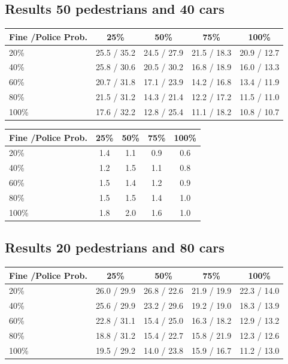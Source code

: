 \documentclass[a4paper]{article}
\begin{document}
\subsection{Results 50 pedestrians and 40 cars}
\begin{table}[H]
\centering
\begin{tabular}{ l | c c c c }
  Fine \slash Police Prob. & 25\% & 50\% & 75\% & 100\% \\ 
  \hline
  20\%  & 25.5 / 35.2 & 24.5 / 27.9 & 21.5 / 18.3 & 20.9 / 12.7  \\
  40\%  & 25.8 / 30.6 & 20.5 / 30.2 & 16.8 / 18.9 & 16.0 / 13.3  \\
  60\%  & 20.7 / 31.8 & 17.1 / 23.9 & 14.2 / 16.8 & 13.4 / 11.9  \\
  80\%  & 21.5 / 31.2 & 14.3 / 21.4 & 12.2 / 17.2 & 11.5 / 11.0  \\
  100\% & 17.6 / 32.2 & 12.8 / 25.4 & 11.1 / 18.2 & 10.8 / 10.7  \\
\end{tabular}
\end{table}

\begin{table}[H]
\centering
\begin{tabular}{ l | c c c c }
  Fine \slash Police Prob. & 25\% & 50\% & 75\% & 100\% \\ 
  \hline
  20\%  & 1.4 & 1.1 & 0.9 & 0.6  \\
  40\%  & 1.2 & 1.5 & 1.1 & 0.8  \\
  60\%  & 1.5 & 1.4 & 1.2 & 0.9  \\
  80\%  & 1.5 & 1.5 & 1.4 & 1.0  \\
  100\% & 1.8 & 2.0 & 1.6 & 1.0  \\
\end{tabular}
\end{table}

\clearpage
\subsection{Results 20 pedestrians and 80 cars}
\begin{table}[H]
\centering
\begin{tabular}{ l | c c c c }
  Fine \slash Police Prob. & 25\% & 50\% & 75\% & 100\% \\ 
  \hline
  20\%  & 26.0 / 29.9 & 26.8 / 22.6 & 21.9 / 19.9 & 22.3 / 14.0  \\
  40\%  & 25.6 / 29.9 & 23.2 / 29.6 & 19.2 / 19.0 & 18.3 / 13.9  \\
  60\%  & 22.8 / 31.1 & 15.4 / 25.0 & 16.3 / 18.2 & 12.9 / 13.2  \\
  80\%  & 18.8 / 31.2 & 15.4 / 22.7 & 15.8 / 21.9 & 12.3 / 12.6  \\
  100\% & 19.5 / 29.2 & 14.0 / 23.8 & 15.9 / 16.7 & 11.2 / 13.0  \\
\end{tabular}
\end{table}
\end{document}
